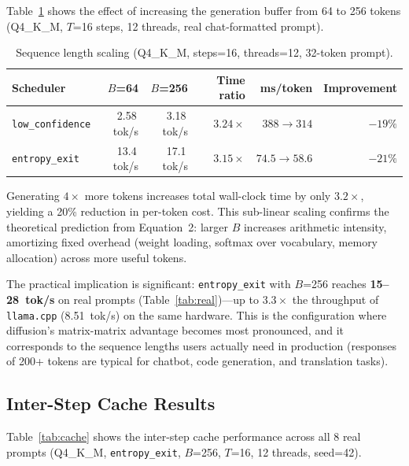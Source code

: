 \documentclass[11pt]{article}
\begin{document}
Table~\ref{tab:seqlen} shows the effect of increasing the generation buffer from 64 to
256 tokens (Q4\_K\_M, $T$=16 steps, 12 threads, real chat-formatted prompt).

\begin{table}[h]
\centering
\caption{Sequence length scaling (Q4\_K\_M, steps=16, threads=12, 32-token prompt).}
\label{tab:seqlen}
\begin{tabular}{lrrrrr}
\toprule
\textbf{Scheduler} & $B$=64 & $B$=256 & \textbf{Time ratio} & \textbf{ms/token} & \textbf{Improvement} \\
\midrule
\texttt{low\_confidence} & 2.58\,tok/s & 3.18\,tok/s & $3.24\times$ & $388 \to 314$ & $-19\%$ \\
\texttt{entropy\_exit} & 13.4\,tok/s & 17.1\,tok/s & $3.15\times$ & $74.5 \to 58.6$ & $-21\%$ \\
\bottomrule
\end{tabular}
\end{table}

Generating $4\times$ more tokens increases total wall-clock time by only $3.2\times$,
yielding a 20\% reduction in per-token cost. This sub-linear scaling confirms the
theoretical prediction from Equation~2: larger $B$ increases arithmetic intensity,
amortizing fixed overhead (weight loading, softmax over vocabulary, memory allocation)
across more useful tokens.

The practical implication is significant: \texttt{entropy\_exit} with $B$=256 reaches
\textbf{15--28~tok/s} on real prompts (Table~\ref{tab:real})---up to $3.3\times$ the
throughput of \texttt{llama.cpp} (8.51~tok/s) on the same hardware. This is the
configuration where diffusion's matrix-matrix advantage becomes most pronounced, and it
corresponds to the sequence lengths users actually need in production (responses of
200+ tokens are typical for chatbot, code generation, and translation tasks).

\subsection{Inter-Step Cache Results}
\label{sec:cache_results}

Table~\ref{tab:cache} shows the inter-step cache performance across all 8 real prompts
(Q4\_K\_M, \texttt{entropy\_exit}, $B$=256, $T$=16, 12 threads, seed=42).
\end{document}

